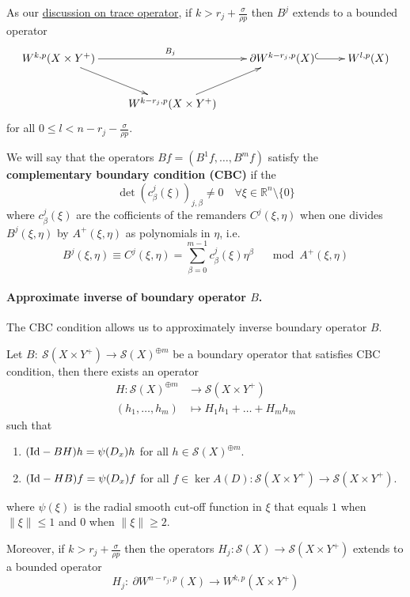 As our \href{./interpolation-sobolev.org}{discussion on trace operator}, if \(k > r_j + \frac{\sigma}{\rho p}\) then \(B^j\) extends to a bounded operator 
\[
 \xymatrix{
W^{k,p}(X\times Y^+) \ar@{->}[rd] \ar@{->}[rr]^{B_j} &  & \partial W^{k-r_j,p}(X) \ar@{^{(}->}[r] & W^{l,p}(X) \\
 & W^{k-r_j,p}(X\times Y^+) \ar@{->}[ru] &  & 
}
\]
for all \(0\leq l < n - r_j - \frac{\sigma}{\rho p}\).


\begin{definition}
We will say that the operators \(Bf = (B^1 f, \dots, B^m f)\) satisfy the \textbf{complementary
boundary condition (CBC)} if the 
\[
 \det \left(c^j_\beta(\xi)\right)_{j,\beta}\ne 0\quad\forall \xi\in \mathbb{R}^n\setminus\{0\}
\]
where \(c^j_\beta(\xi)\) are the cofficients of the remanders \(C^j(\xi,\eta)\) when one divides \(B^j(\xi,\eta)\) by \(A^+(\xi,\eta)\) as polynomials in \(\eta\), i.e.
\[
B^j(\xi,\eta) \equiv C^j(\xi,\eta) = \sum_{\beta =
0}^{m-1}c^j_\beta(\xi)\eta^\beta\quad\mod A^+(\xi,\eta)
\]
\end{definition}

\paragraph{Approximate inverse of boundary operator \(B\).}
\label{sec:org52b14de}
The CBC condition allows us to approximately inverse boundary operator \(B\).

\begin{theorem}
\label{thm:approx-inv-B}
Let \(B:\ \mathcal{S}(X\times Y^+) \longrightarrow \mathcal{S}(X)^{\oplus m}\) be a
boundary operator that satisfies CBC condition, then there exists an operator
\begin{align*}
  H: \mathcal{S}(X)^{\oplus m} &\longrightarrow \mathcal{S}(X\times Y^+)\\
     (h_1,\dots,h_m) &\longmapsto H_1 h_1 + \dots + H_m h_m
\end{align*}
such that
\begin{enumerate}
\item \(({\rm Id} - BH)h = \psi(D_x)h\) for all \(h\in \mathcal{S}(X)^{\oplus m}\).
\item \(({\rm Id} - HB)f = \psi(D_x)f\) for all \(f\in \ker A(D): \mathcal{S}(X\times Y^+)
   \longrightarrow \mathcal{S}(X\times Y^+)\).
\end{enumerate}
where \(\psi(\xi)\) is the radial smooth cut-off function in \(\xi\) that equals \(1\) when
\(\|\xi\|\leq 1\) and \(0\) when \(\|\xi\|\geq 2\).

Moreover, if \(k>r_j + \frac{\sigma}{\rho p}\) then the operators \(H_j: \mathcal{S}(X)
\longrightarrow \mathcal{S}(X\times Y^+)\) extends to a bounded operator
\[
 H_j:\ \partial W^{n-r_j,p}(X) \longrightarrow W^{k,p}(X\times Y^+)
\]
\end{theorem}

